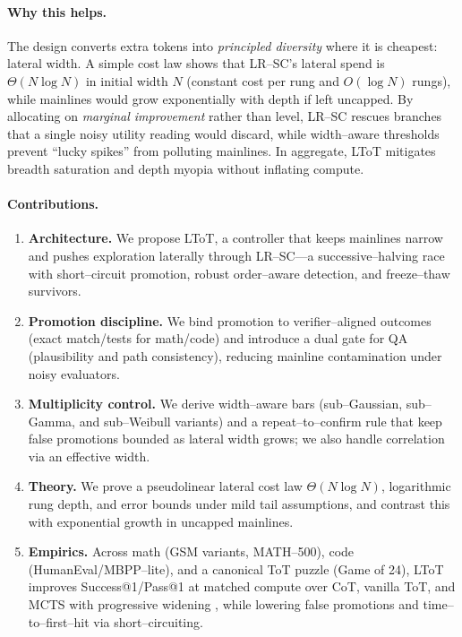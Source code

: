 \documentclass{article}
\begin{document}
\paragraph{Why this helps.}
The design converts extra tokens into \emph{principled diversity} where it is cheapest: lateral width.
A simple cost law shows that LR--SC's lateral spend is $\Theta(N\log N)$ in initial width $N$ (constant cost per rung and $O(\log N)$ rungs), while mainlines would grow exponentially with depth if left uncapped.
By allocating on \emph{marginal improvement} rather than level, LR--SC rescues branches that a single noisy utility reading would discard, while width--aware thresholds prevent ``lucky spikes'' from polluting mainlines.
In aggregate, LToT mitigates breadth saturation and depth myopia without inflating compute.

\paragraph{Contributions.}
\begin{enumerate}[leftmargin=*, itemsep=2pt, topsep=2pt]
    \item \textbf{Architecture.} We propose LToT, a controller that keeps mainlines narrow and pushes exploration laterally through LR--SC---a successive--halving race with short--circuit promotion, robust order--aware detection, and freeze--thaw survivors.
    \item \textbf{Promotion discipline.} We bind promotion to verifier--aligned outcomes (exact match/tests for math/code) and introduce a dual gate for QA (plausibility and path consistency), reducing mainline contamination under noisy evaluators.
    \item \textbf{Multiplicity control.} We derive width--aware bars (sub--Gaussian, sub--Gamma, and sub--Weibull variants) and a repeat--to--confirm rule that keep false promotions bounded as lateral width grows; we also handle correlation via an effective width.
    \item \textbf{Theory.} We prove a pseudolinear lateral cost law $\Theta(N\log N)$, logarithmic rung depth, and error bounds under mild tail assumptions, and contrast this with exponential growth in uncapped mainlines.
    \item \textbf{Empirics.} Across math (GSM variants, MATH--500), code (HumanEval/MBPP--lite), and a canonical ToT puzzle (Game of 24), LToT improves Success@1/Pass@1 at matched compute over CoT, vanilla ToT, and MCTS with progressive widening \citep{xie2024mcts}, while lowering false promotions and time--to--first--hit via short--circuiting.
\end{enumerate}
\end{document}
